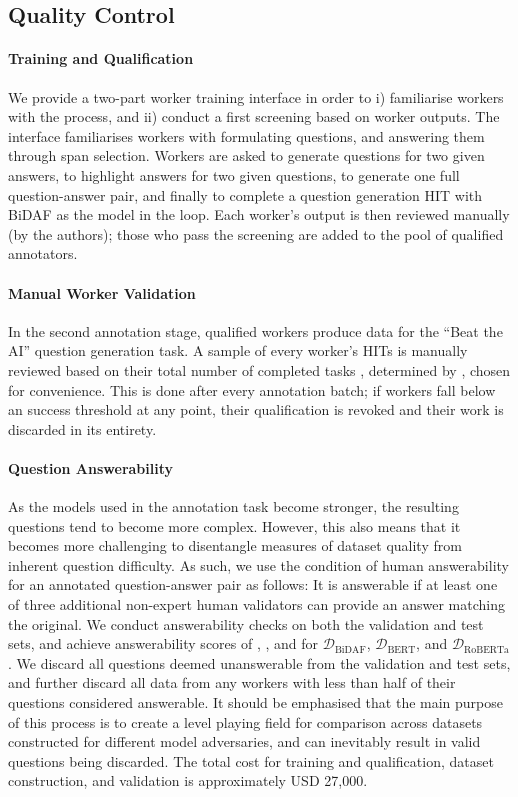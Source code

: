 \documentclass[11pt,a4paper]{article}
\newcommand{\dataset}[1]{\ensuremath{\mathcal{D_{\mathrm{#1}}}}}
\begin{document}
\subsection{Quality Control}
\paragraph{Training and Qualification}{
We provide a two-part worker training interface in order to i) familiarise workers with the process, and ii) conduct a first screening based on worker outputs.
The interface familiarises workers with formulating questions, and answering them through span selection.
Workers are asked to generate questions for two given answers, to highlight answers for two given questions, to generate one full question-answer pair, and finally to complete a question generation HIT with BiDAF as the model in the loop. 
Each worker's output is then reviewed manually (by the authors); those who pass the screening are added to the pool of qualified annotators.
}

\paragraph{Manual Worker Validation}{
In the second annotation stage, qualified workers produce data for the ``Beat the AI'' question generation task.
A sample of every worker's HITs is manually reviewed based on their total number of completed tasks , determined by , chosen for convenience. 
This is done after every annotation batch; if workers fall below an  success threshold at any point, their qualification is revoked and their work is discarded in its entirety.
}

\paragraph{Question Answerability}{
As the models used in the annotation task become stronger, the resulting questions tend to become more complex.
However, this also means that it becomes more challenging to disentangle measures of dataset quality from inherent question difficulty. 
As such, we use the condition of human answerability for an annotated question-answer pair as follows:
It is answerable if at least one of three additional non-expert human validators can provide an answer matching the original. 
We conduct answerability checks on both the validation and test sets, and achieve answerability scores of , , and  for \dataset{BiDAF}, \dataset{BERT}, and \dataset{RoBERTa}. 
We discard all questions deemed unanswerable from the validation and test sets, and further discard all data from any workers with less than half of their questions considered answerable. 
It should be emphasised that the main purpose of this process is to create a level playing field for comparison across datasets constructed for different model adversaries, and can inevitably result in valid questions being discarded.
The total cost for training and qualification, dataset construction, and validation is approximately USD 27,000.
}
\end{document}
